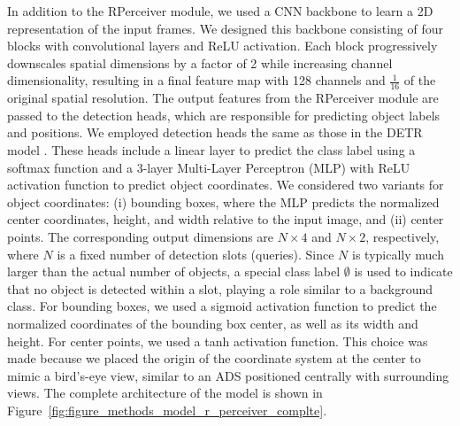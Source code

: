 In addition to the RPerceiver module, we used a CNN backbone to learn a 2D representation of the input frames. We designed this backbone consisting of four blocks with convolutional layers and ReLU activation. Each block progressively downscales spatial dimensions by a factor of 2 while increasing channel dimensionality, resulting in a final feature map with 128 channels and $\frac{1}{16}$ of the original spatial resolution.
The output features from the RPerceiver module are passed to the detection heads, which are responsible for predicting object labels and positions. We employed detection heads the same as those in the DETR model \cite{carionEndtoEndObjectDetection2020}. These heads include a linear layer to predict the class label using a softmax function and a 3-layer Multi-Layer Perceptron (MLP) with ReLU activation function to predict object coordinates. We considered two variants for object coordinates: (i) bounding boxes, where the MLP predicts the normalized center coordinates, height, and width relative to the input image, and (ii) center points. The corresponding output dimensions are $N \times 4$ and $N \times 2$, respectively, where $N$ is a fixed number of detection slots (queries). Since $N$ is typically much larger than the actual number of objects, a special class label $\emptyset$ is used to indicate that no object is detected within a slot, playing a role similar to a background class.
For bounding boxes, we used a sigmoid activation function to predict the normalized coordinates of the bounding box center, as well as its width and height. For center points, we used a tanh activation function. This choice was made because we placed the origin of the coordinate system at the center to mimic a bird's-eye view, similar to an ADS positioned centrally with surrounding views.
The complete architecture of the model is shown in Figure~\ref{fig:figure_methods_model_r_perceiver_complte}.


